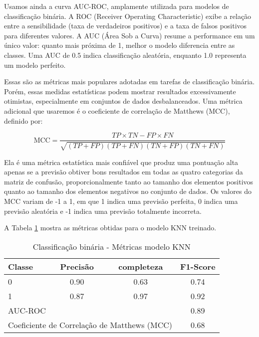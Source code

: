 Usamos ainda a curva AUC-ROC, amplamente utilizada para modelos de classificação binária. A ROC (Receiver Operating Characteristic) exibe a relação entre a sensibilidade (taxa de verdadeiros positivos) e a taxa de falsos positivos para diferentes valores. A AUC (Área Sob a Curva) resume a performance em um único valor: quanto mais próxima de 1, melhor o modelo diferencia entre as classes. Uma AUC de 0.5 indica classificação aleatória, enquanto 1.0 representa um modelo perfeito.

Essas são as métricas mais populares adotadas em tarefas de classificação binária. Porém, essas medidas estatísticas podem mostrar resultados excessivamente otimistas, especialmente em conjuntos de dados desbalanceados. Uma métrica adicional que usaremos é o coeficiente de correlação de Matthews (MCC), definido por:

\begin{equation}
    \text{MCC} = \frac{TP \times TN - FP \times FN}{\sqrt{(TP + FP)(TP + FN)(TN + FP)(TN + FN)}}
\end{equation}

Ela é uma métrica estatística mais confiável que produz uma pontuação alta apenas se a previsão obtiver bons resultados em todas as quatro categorias da matriz de confusão, proporcionalmente tanto ao tamanho dos elementos positivos quanto ao tamanho dos elementos negativos no conjunto de dados. Os valores do MCC variam de -1 a 1, em que 1 indica uma previsão perfeita, 0 indica uma previsão aleatória e -1 indica uma previsão totalmente incorreta.

A Tabela \ref{metricas_modelo} mostra as métricas obtidas para o modelo KNN treinado.

\begin{table}[!ht]
    \centering
    \caption{Classificação binária - Métricas modelo KNN}
    \begin{tabular}{lccc}
        \toprule
        Classe & Precisão & completeza & F1-Score \\
        \midrule
        0 & 0.90 & 0.63 & 0.74 \\
        1 & 0.87 & 0.97 & 0.92 \\
        \midrule
        \multicolumn{3}{l}{AUC-ROC} & 0.89 \\
        \multicolumn{3}{l}{Coeficiente de Correlação de Matthews (MCC)} & 0.68 \\
        \bottomrule
    \end{tabular}
    \label{metricas_modelo}
\end{table}

